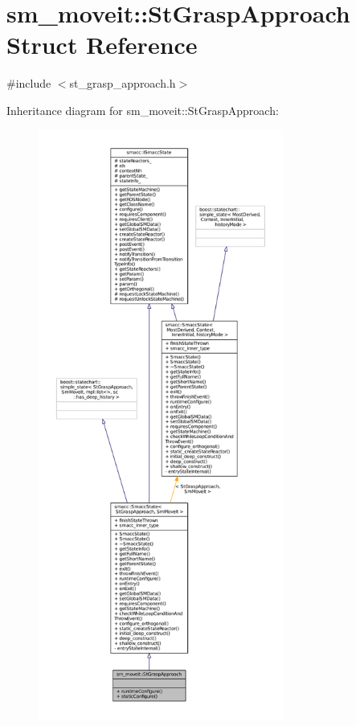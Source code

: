 \hypertarget{structsm__moveit_1_1StGraspApproach}{}\section{sm\+\_\+moveit\+:\+:St\+Grasp\+Approach Struct Reference}
\label{structsm__moveit_1_1StGraspApproach}


{\ttfamily \#include $<$st\+\_\+grasp\+\_\+approach.\+h$>$}



Inheritance diagram for sm\+\_\+moveit\+:\+:St\+Grasp\+Approach\+:
\nopagebreak
\begin{figure}[H]
\begin{center}
\leavevmode
\includegraphics[height=550pt]{structsm__moveit_1_1StGraspApproach__inherit__graph}
\end{center}
\end{figure}


